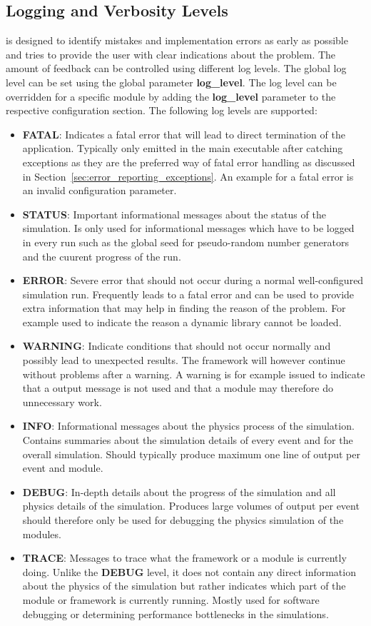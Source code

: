 \subsection{Logging and Verbosity Levels}
\label{sec:logging_verbosity}
\apsq is designed to identify mistakes and implementation errors as early as possible and tries to provide the user with clear indications about the problem.
The amount of feedback can be controlled using different log levels.
The global log level can be set using the global parameter \textbf{log\_level}.
The log level can be overridden for a specific module by adding the \textbf{log\_level} parameter to the respective configuration section.
The following log levels are supported:
\begin{itemize}
\item \textbf{FATAL}: Indicates a fatal error that will lead to direct termination of the application.
Typically only emitted in the main executable after catching exceptions as they are the preferred way of fatal error handling as discussed in Section~\ref{sec:error_reporting_exceptions}.
An example for a fatal error is an invalid configuration parameter.
\item \textbf{STATUS}: Important informational messages about the status of the simulation.
Is only used for informational messages which have to be logged in every run such as the global seed for pseudo-random number generators and the cuurent progress of the run.
\item \textbf{ERROR}: Severe error that should not occur during a normal well-configured simulation run.
Frequently leads to a fatal error and can be used to provide extra information that may help in finding the reason of the problem.
For example used to indicate the reason a dynamic library cannot be loaded.
\item \textbf{WARNING}: Indicate conditions that should not occur normally and possibly lead to unexpected results.
The framework will however continue without problems after a warning.
A warning is for example issued to indicate that a output message is not used and that a module may therefore do unnecessary work.
\item \textbf{INFO}: Informational messages about the physics process of the simulation.
Contains summaries about the simulation details of every event and for the overall simulation.
Should typically produce maximum one line of output per event and module.
\item \textbf{DEBUG}: In-depth details about the progress of the simulation and all physics details of the simulation.
Produces large volumes of output per event should therefore only be used for  debugging the physics simulation of the modules.
\item \textbf{TRACE}: Messages to trace what the framework or a module is currently doing.
Unlike the \textbf{DEBUG} level, it does not contain any direct information about the physics of the simulation but rather indicates which part of the module or framework is currently running.
Mostly used for software debugging or determining performance bottlenecks in the simulations.
\end{itemize}

